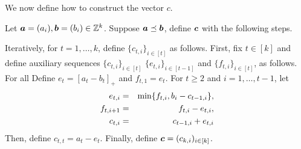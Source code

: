 \documentclass[runningheads]{llncs}
\begin{document}

We now define how to construct the vector $c$.
\begin{definition}\label{def: buffer vector c}
Let $\boldsymbol a = (a_i),\boldsymbol b = (b_i)\in\mathbb Z^k$. 
Suppose $\boldsymbol a\preceq\boldsymbol b$, define $\boldsymbol c$ with the following steps.

Iteratively, for $t=1, \dots, k$, define $\{c_{t,i}\}_{i\in[t]}$ as follows. 
First, fix $t\in [k]$ and define auxiliary sequences $\{c_{t,i}\}_{i\in[t]}$ $\{e_{t,i}\}_{i\in[t-1]}$ and $\{f_{t,i}\}_{i\in[t]}$, as follows. For all 
Define $e_t = [a_t - b_t]_+$ and $f_{t,1} = e_t$. 
For $t\geq 2$ and $i = 1,\dots, t-1$, let
\begin{eqnarray}\label{eqn: recursive def ef}
    e_{t, i} &   =&\min\{f_{t,i}, b_i - c_{t-1,i}\},  \\
    f_{t, i+1} & =&  f_{t,i} - e_{t,i},\notag\\
    c_{t,i} &=& c_{t-1, i} + e_{t,i}\notag
\end{eqnarray}
Then, define $c_{t,t} = a_t - e_t$.
Finally, define $\boldsymbol c = (c_{k,i})_{i\in[k]}$. 
\end{definition}

\end{document}
